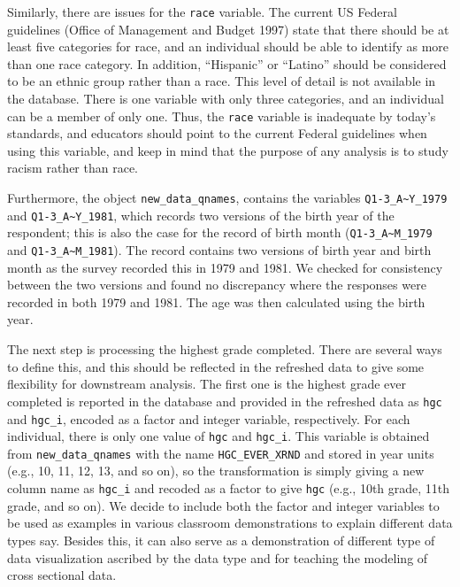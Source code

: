 \documentclass[12pt]{article}
\begin{document}
Similarly, there are issues for the \texttt{race} variable. The current US Federal guidelines (Office of Management and Budget 1997) state that there should be at least five categories for race, and an individual should be able to identify as more than one race category. In addition, ``Hispanic'' or ``Latino'' should be considered to be an ethnic group rather than a race. This level of detail is not available in the database. There is one variable with only three categories, and an individual can be a member of only one. Thus, the \texttt{race} variable is inadequate by today's standards, and educators should point to the current Federal guidelines when using this variable, and keep in mind that the purpose of any analysis is to study racism rather than race.

Furthermore, the object \texttt{new\_data\_qnames}, contains the variables \texttt{Q1-3\_A\textasciitilde{}Y\_1979} and \texttt{Q1-3\_A\textasciitilde{}Y\_1981}, which records two versions of the birth year of the respondent; this is also the case for the record of birth month (\texttt{Q1-3\_A\textasciitilde{}M\_1979} and \texttt{Q1-3\_A\textasciitilde{}M\_1981}). The record contains two versions of birth year and birth month as the survey recorded this in 1979 and 1981. We checked for consistency between the two versions and found no discrepancy where the responses were recorded in both 1979 and 1981. The age was then calculated using the birth year.

The next step is processing the highest grade completed. There are several ways to define this, and this should be reflected in the refreshed data to give some flexibility for downstream analysis. The first one is the highest grade ever completed is reported in the database and provided in the refreshed data as \texttt{hgc} and \texttt{hgc\_i}, encoded as a factor and integer variable, respectively. For each individual, there is only one value of \texttt{hgc} and \texttt{hgc\_i}. This variable is obtained from \texttt{new\_data\_qnames} with the name \texttt{HGC\_EVER\_XRND} and stored in year units (e.g., 10, 11, 12, 13, and so on), so the transformation is simply giving a new column name as \texttt{hgc\_i} and recoded as a factor to give \texttt{hgc} (e.g., 10th grade, 11th grade, and so on). We decide to include both the factor and integer variables to be used as examples in various classroom demonstrations to explain different data types say. Besides this, it can also serve as a demonstration of different type of data visualization ascribed by the data type and for teaching the modeling of cross sectional data.
\end{document}
